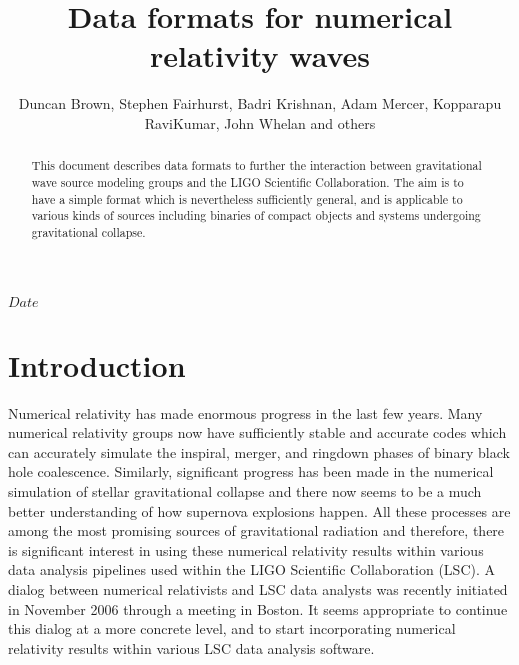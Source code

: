 \documentclass[10pt]{ligodcc}
\title{Data formats for numerical relativity waves}
\author{Duncan Brown, Stephen Fairhurst, Badri Krishnan, Adam Mercer,
Kopparapu RaviKumar, John Whelan and others}
\begin{document}
\maketitle


\tableofcontents

\newcommand{\Ys}{{{}^{-s}Y}}
\newcommand{\Ytwo}{{{}^{-2}Y}}
\newcommand{\tens}[1]{\tensor{#1}}
\newcommand{\xhat}{\vec{e}_x}
\newcommand{\yhat}{\vec{e}_y}
\newcommand{\zhat}{\vec{e}_z}
\newcommand{\ihat}{\vec{e}_i}
\newcommand{\jhat}{\vec{e}_j}
\newcommand{\rhat}{\vec{e}_{r}}
\newcommand{\iotahat}{\vec{e}_{\iota}}
\newcommand{\phihat}{\vec{e}_{\phi}}
\newcommand{\eplus}{\tens{e}_+}
\newcommand{\ecross}{\tens{e}_\times}

\RCS $Date$
\date{\RCSDate}

\begin{abstract}
  This document describes data formats to further the interaction
  between gravitational wave source modeling groups and the LIGO
  Scientific Collaboration. The aim is to have a simple format which
  is nevertheless sufficiently general, and is applicable to various
  kinds of sources including binaries of compact objects and systems
  undergoing gravitational collapse.
\end{abstract}

\section{Introduction}
\label{sec:intro}

Numerical relativity has made enormous progress in the last few years.
Many numerical relativity groups now have sufficiently stable and
accurate codes which can accurately simulate the inspiral, merger, and
ringdown phases of binary black hole coalescence.  Similarly,
significant progress has been made in the numerical simulation of
stellar gravitational collapse and there now seems to be a much better
understanding of how supernova explosions happen.  All these processes
are among the most promising sources of gravitational radiation and
therefore, there is significant interest in using these numerical
relativity results within various data analysis pipelines used within
the LIGO Scientific Collaboration (LSC).  A dialog between numerical
relativists and LSC data analysts was recently initiated in November
2006 through a meeting in Boston. It seems appropriate to continue
this dialog at a more concrete level, and to start incorporating
numerical relativity results within various LSC data analysis
software.
\end{document}
